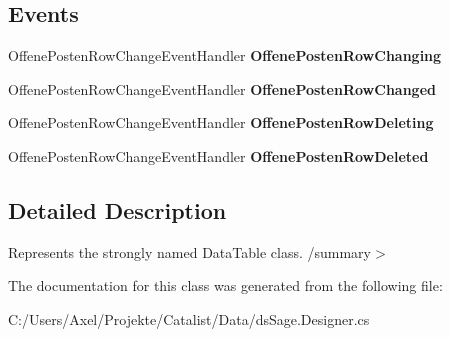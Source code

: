 \subsection*{Events}
\begin{DoxyCompactItemize}
\item 
Offene\+Posten\+Row\+Change\+Event\+Handler {\bfseries Offene\+Posten\+Row\+Changing}\hypertarget{class_products_1_1_data_1_1ds_sage_1_1_offene_posten_data_table_a8fccd47f8cb9a89dc719ba2d79551cd2}{}\label{class_products_1_1_data_1_1ds_sage_1_1_offene_posten_data_table_a8fccd47f8cb9a89dc719ba2d79551cd2}

\item 
Offene\+Posten\+Row\+Change\+Event\+Handler {\bfseries Offene\+Posten\+Row\+Changed}\hypertarget{class_products_1_1_data_1_1ds_sage_1_1_offene_posten_data_table_a5eed8f62d2348fcc6d6308fb44fc0e57}{}\label{class_products_1_1_data_1_1ds_sage_1_1_offene_posten_data_table_a5eed8f62d2348fcc6d6308fb44fc0e57}

\item 
Offene\+Posten\+Row\+Change\+Event\+Handler {\bfseries Offene\+Posten\+Row\+Deleting}\hypertarget{class_products_1_1_data_1_1ds_sage_1_1_offene_posten_data_table_afcefb7484f86010dcbfb718dcfe02ab4}{}\label{class_products_1_1_data_1_1ds_sage_1_1_offene_posten_data_table_afcefb7484f86010dcbfb718dcfe02ab4}

\item 
Offene\+Posten\+Row\+Change\+Event\+Handler {\bfseries Offene\+Posten\+Row\+Deleted}\hypertarget{class_products_1_1_data_1_1ds_sage_1_1_offene_posten_data_table_a66c4f18e8c5d57e391f085d4c087ebca}{}\label{class_products_1_1_data_1_1ds_sage_1_1_offene_posten_data_table_a66c4f18e8c5d57e391f085d4c087ebca}

\end{DoxyCompactItemize}


\subsection{Detailed Description}
Represents the strongly named Data\+Table class. /summary$>$ 

The documentation for this class was generated from the following file\+:\begin{DoxyCompactItemize}
\item 
C\+:/\+Users/\+Axel/\+Projekte/\+Catalist/\+Data/ds\+Sage.\+Designer.\+cs\end{DoxyCompactItemize}

